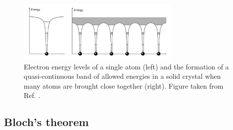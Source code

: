 \documentclass[11pt, twoside]{report}
\begin{document}
\begin{figure}[h!]
  \centering
    \includegraphics[width=0.7\textwidth]{figures/band_Elevels.png}
    \caption[Electron energy levels of a single atom (left) and the formation of a quasi-continuous band of allowed energies in a solid crystal when many atoms are brought close together (right).]{Electron energy levels of a single atom (left) and the formation of a quasi-continuous band of allowed energies in a solid crystal when many atoms are brought close together (right). Figure taken from Ref. .}
  \label{band_Elevels}
\end{figure}

\subsection{Bloch's theorem}
\end{document}
